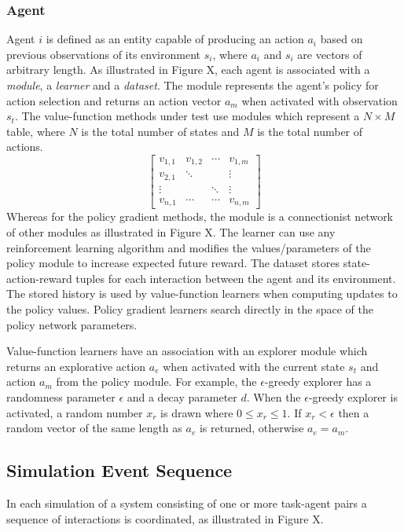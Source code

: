 \subsubsection{Agent}
Agent $i$ is defined as an entity capable of producing an action $a_i$
based on previous observations of its environment $s_i$, where $a_i$ and $s_i$
are vectors of arbitrary length.  As illustrated in Figure X, each agent is
associated with a \textit{module}, a \textit{learner} and a \textit{dataset}.
The module represents the agent's policy for action selection and returns an
action vector $a_m$ when activated with observation $s_t$.  The value-function
methods under test use modules which represent a $N \times M$ table, where $N$
is the total number of states and $M$ is the total number of actions.
\begin{equation}
\begin{bmatrix}
v_{1,1}& v_{1,2}& \dotsb& v_{1,m}\\
v_{2,1}& \ddots& & \vdots\\
\vdots& &\ddots& \vdots\\
v_{n,1}& \dotsb& \dotsb& v_{n,m}
\end{bmatrix}
\end{equation}
Whereas for the policy gradient methods, the module is a connectionist network
of other modules as illustrated in Figure X.  The learner can use any
reinforcement learning algorithm and modifies the values/parameters of the
policy module to increase expected future reward.  The dataset stores
state-action-reward tuples for each interaction between the agent and its
environment.  The stored history is used by value-function learners when
computing updates to the policy values.  Policy gradient learners search
directly in the space of the policy network parameters.

Value-function learners have an association with an explorer module which
returns an explorative action $a_e$ when activated with the current state $s_t$
and action $a_m$ from the policy module.  For example, the $\epsilon$-greedy
explorer has a randomness parameter $\epsilon$ and a decay parameter $d$.  When
the $\epsilon$-greedy explorer is activated, a random number $x_r$ is drawn
where $0 \leq x_r \leq 1$.  If $x_r < \epsilon$ then a random vector of the same
length as $a_e$ is returned, otherwise $a_e = a_m$.

\subsection{Simulation Event Sequence}
In each simulation of a system consisting of one or more task-agent pairs a
sequence of interactions is coordinated, as illustrated in Figure X.

